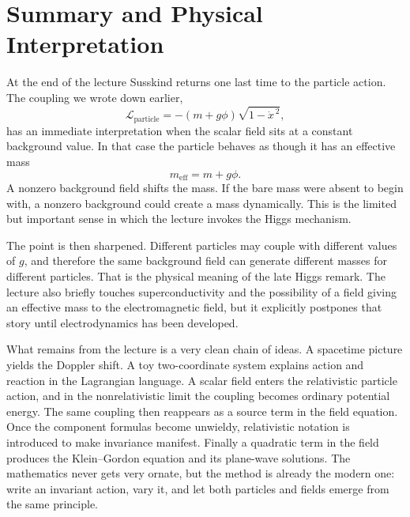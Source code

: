 \section{Summary and Physical Interpretation}

At the end of the lecture Susskind returns one last time to the particle action. The coupling we wrote down earlier,
\begin{equation}
\mathcal L_{\mathrm{particle}}
=
-(m+g\phi)\sqrt{1-\dot x^{\,2}},
\end{equation}
has an immediate interpretation when the scalar field sits at a constant background value. In that case the particle behaves as though it has an effective mass
\begin{equation}
m_{\mathrm{eff}}=m+g\phi.
\end{equation}
A nonzero background field shifts the mass. If the bare mass were absent to begin with, a nonzero background could create a mass dynamically. This is the limited but important sense in which the lecture invokes the Higgs mechanism.

The point is then sharpened. Different particles may couple with different values of \(g\), and therefore the same background field can generate different masses for different particles. That is the physical meaning of the late Higgs remark. The lecture also briefly touches superconductivity and the possibility of a field giving an effective mass to the electromagnetic field, but it explicitly postpones that story until electrodynamics has been developed.

What remains from the lecture is a very clean chain of ideas. A spacetime picture yields the Doppler shift. A toy two-coordinate system explains action and reaction in the Lagrangian language. A scalar field enters the relativistic particle action, and in the nonrelativistic limit the coupling becomes ordinary potential energy. The same coupling then reappears as a source term in the field equation. Once the component formulas become unwieldy, relativistic notation is introduced to make invariance manifest. Finally a quadratic term in the field produces the Klein--Gordon equation and its plane-wave solutions. The mathematics never gets very ornate, but the method is already the modern one: write an invariant action, vary it, and let both particles and fields emerge from the same principle.